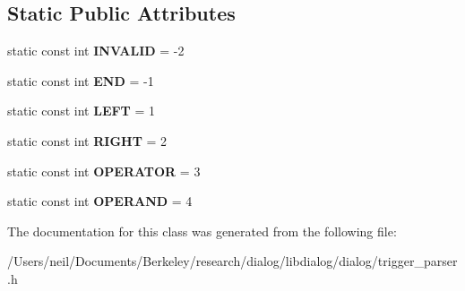 \subsection*{Static Public Attributes}
\begin{DoxyCompactItemize}
\item 
\mbox{\label{classdialog_1_1trigger__lexer_adf06ecddf6fef7b28af0aa32fbcb541f}} 
static const int {\bfseries I\+N\+V\+A\+L\+ID} = -\/2
\item 
\mbox{\label{classdialog_1_1trigger__lexer_af5911c5c3ace43057522ceba49590fcb}} 
static const int {\bfseries E\+ND} = -\/1
\item 
\mbox{\label{classdialog_1_1trigger__lexer_aa5e047f50c2134563f363fcfcf118068}} 
static const int {\bfseries L\+E\+FT} = 1
\item 
\mbox{\label{classdialog_1_1trigger__lexer_ac85684104fecfda94ce67f18800fbe84}} 
static const int {\bfseries R\+I\+G\+HT} = 2
\item 
\mbox{\label{classdialog_1_1trigger__lexer_a93512c86a07ca4f4db552b3caf4a18d0}} 
static const int {\bfseries O\+P\+E\+R\+A\+T\+OR} = 3
\item 
\mbox{\label{classdialog_1_1trigger__lexer_a2f1c98e898271eb595ab23d9f2ccb143}} 
static const int {\bfseries O\+P\+E\+R\+A\+ND} = 4
\end{DoxyCompactItemize}


The documentation for this class was generated from the following file\+:\begin{DoxyCompactItemize}
\item 
/\+Users/neil/\+Documents/\+Berkeley/research/dialog/libdialog/dialog/trigger\+\_\+parser.\+h\end{DoxyCompactItemize}

